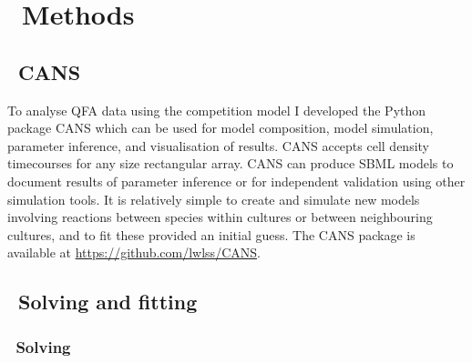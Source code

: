\graphicspath{{images/}}

\section{\thesection~Methods}
\label{sec:methods}

\subsection{\thesubsection~CANS}

To analyse QFA data using the competition model I developed the Python
package CANS which can be used for model composition, model
simulation, parameter inference, and visualisation of results. CANS
accepts cell density timecourses for any size rectangular array. CANS
can produce SBML models to document results of parameter inference or
for independent validation using other simulation tools. It is
relatively simple to create and simulate new models involving
reactions between species within cultures or between neighbouring
cultures, and to fit these provided an initial guess. The CANS package
is available at
\href{https://github.com/lwlss/CANS}{https://github.com/lwlss/CANS}.

\subsection{\thesubsection~Solving and fitting}

\subsubsection{\thesubsubsection~Solving}
\label{sec:solving_comp}

